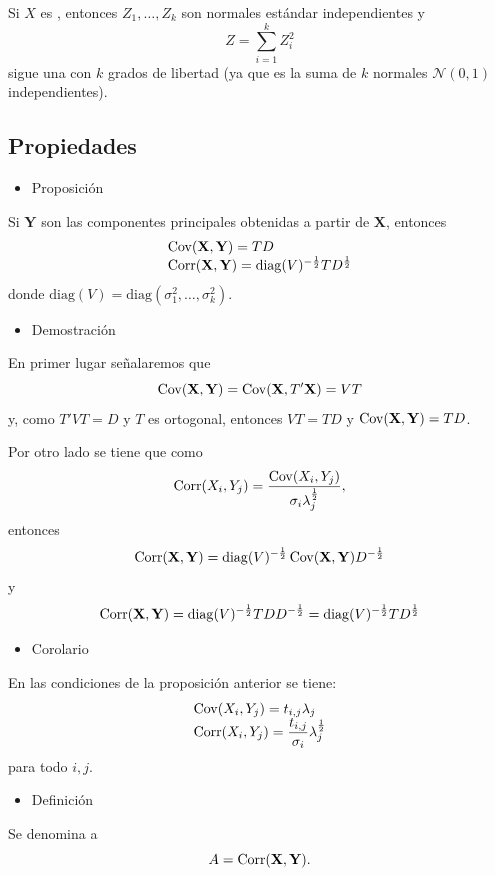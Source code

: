 Si $X$ es , entonces $Z_1,\dots,Z_k$ son normales estándar independientes y \[ Z=\sum_{i=1}^{k}Z_i^2 \]sigue una  con $k$ grados de libertad (ya que es la suma de $k$ normales $\mathcal{N}(0,1)$ independientes).
\subsection{Propiedades}
\begin{itemize}[label=\color{red}\textbullet, leftmargin=*]
	\item \color{lightblue}Proposición
\end{itemize}
Si $\mathbf{Y}$ son las componentes principales obtenidas a partir de $\mathbf{X}$, entonces \[ \begin{array}{l}
	\operatorname{Cov}(\mathbf{X,Y})=TD\\
	\operatorname{Corr}(\mathbf{X,Y})=\mathrm{diag}(V)^{-\frac{1}{2}}TD^{\frac{1}{2}}
\end{array} \] donde $\mathrm{diag}(V)=\mathrm{diag}(\sigma_1^2,\dots,\sigma_k^2)$.
\begin{itemize}[label=\color{red}\textbullet, leftmargin=*]
	\item \color{lightblue}Demostración
\end{itemize}
En primer lugar señalaremos que \[ \operatorname{Cov}(\mathbf{X,Y})=\operatorname{Cov}(\mathbf{X},T'\mathbf{X})=VT \] y, como $T'VT=D$ y $T$ es ortogonal, entonces $VT=TD$ y $\operatorname{Cov}(\mathbf{X,Y})=TD$.

Por otro lado se tiene que como \[ \operatorname{Corr}(X_i,Y_j)=\dfrac{\operatorname{Cov}(X_i,Y_j)}{\sigma_i\lambda_j^{\frac{1}{2}}}, \]entonces \[ \operatorname{Corr}(\mathbf{X,Y})=\mathrm{diag}(V)^{-\frac{1}{2}}\operatorname{Cov}(\mathbf{X,Y})D^{-\frac{1}{2}} \]y\[ \operatorname{Corr}(\mathbf{X,Y})=\mathrm{diag}(V)^{-\frac{1}{2}}TDD^{-\frac{1}{2}}=\mathrm{diag}(V)^{-\frac{1}{2}}TD^{\frac{1}{2}} \]
\begin{itemize}[label=\color{red}\textbullet, leftmargin=*]
	\item \color{lightblue}Corolario
\end{itemize}
En las condiciones de la proposición anterior se tiene: \[ \begin{array}{l}
	\operatorname{Cov}(X_i,Y_j)=t_{i,j}\lambda_j\\
	\operatorname{Corr}(X_i,Y_j)=\dfrac{t_{i,j}}{\sigma_i}\lambda_j^{\frac{1}{2}}
\end{array} \] para todo $i,j$.
\begin{itemize}[label=\color{red}\textbullet, leftmargin=*]
	\item \color{lightblue}Definición
\end{itemize}
Se denomina  a \[ A=\operatorname{Corr}(\mathbf{X,Y}). \]
\Ej

